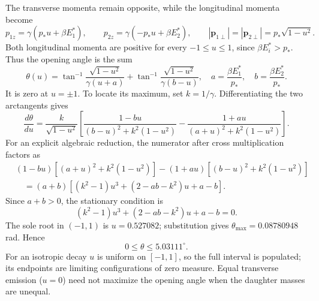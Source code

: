 The transverse momenta remain opposite, while the longitudinal
momenta become
\[
p_{1z}=\gamma(p_*u+\beta E_1^*),\qquad
p_{2z}=\gamma(-p_*u+\beta E_2^*),\qquad
|\mathbf p_{1\perp}|=|\mathbf p_{2\perp}|=p_*\sqrt{1-u^2}.
\]
Both longitudinal momenta are positive for every $-1\leq u\leq1$,
since $\beta E_i^*>p_*$. Thus the opening angle is the sum
\[
\theta(u)=\tan^{-1}\frac{\sqrt{1-u^2}}{\gamma(u+a)}
+\tan^{-1}\frac{\sqrt{1-u^2}}{\gamma(b-u)},\quad
 a=\frac{\beta E_1^*}{p_*},\quad b=\frac{\beta E_2^*}{p_*}.
\]
It is zero at $u=\pm1$. To locate its maximum, set $k=1/\gamma$.
Differentiating the two arctangents gives
\[
\frac{d\theta}{du}=\frac{k}{\sqrt{1-u^2}}
\left[\frac{1-bu}{(b-u)^2+k^2(1-u^2)}
-\frac{1+au}{(a+u)^2+k^2(1-u^2)}\right].
\]
For an explicit algebraic reduction, the numerator after cross
multiplication factors as
\[
\begin{aligned}
&(1-bu)[(a+u)^2+k^2(1-u^2)]
 -(1+au)[(b-u)^2+k^2(1-u^2)]\\
&\quad=(a+b)[(k^2-1)u^3+(2-ab-k^2)u+a-b].
\end{aligned}
\]
Since $a+b>0$, the stationary condition is
\[
(k^2-1)u^3+(2-ab-k^2)u+a-b=0.
\]
The sole root in $(-1,1)$ is $u=0.527082$; substitution gives
$\theta_{\max}=0.08780948$ rad. Hence
\[
\boxed{0\leq\theta\leq5.03111^\circ.}
\]
For an isotropic decay $u$ is uniform on $[-1,1]$, so the full
interval is populated; its endpoints are limiting configurations
of zero measure. Equal transverse emission ($u=0$) need not
maximize the opening angle when the daughter masses are unequal.

